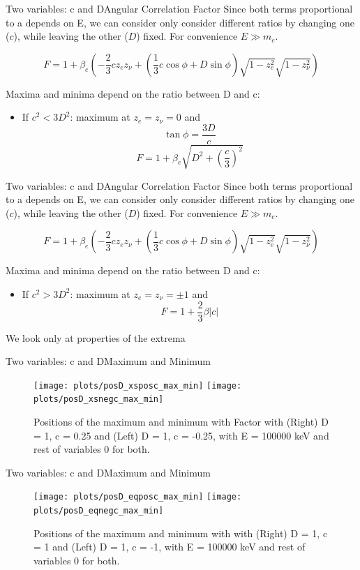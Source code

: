 \documentclass{beamer}
\begin{document}
\begin{frame}{Two variables: c and D}{Angular Correlation Factor}
	Since both terms proportional to a depends on E, we can consider only consider different ratios by changing one ($c$), while leaving the other ($D$) fixed. For convenience $E \gg m_e$.
	
	$$F = 1 + \beta_e\left(-\frac 23 c z_ez_\nu + \left(\frac 13 c\cos\phi + D \sin  \phi\right) \sqrt{1-z^2_e}\sqrt{1-z^2_\nu}\right)$$
	
	Maxima and minima depend on the ratio between D and c:
	\begin{itemize}
		\item If $c^2 < 3D^2$: maximum at $z_e = z_\nu = 0$ and	
		$$\tan\phi = \frac {3D}c$$
		$$F = 1 + \beta_e\sqrt{D^2+\left(\frac c3\right)^2}$$ 
	\end{itemize}
\end{frame}
\begin{frame}{Two variables: c and D}{Angular Correlation Factor}
	Since both terms proportional to a depends on E, we can consider only consider different ratios by changing one ($c$), while leaving the other ($D$) fixed. For convenience $E \gg m_e$.
	
	$$F = 1 + \beta_e\left(-\frac 23 c z_ez_\nu + \left(\frac 13 c\cos\phi + D \sin  \phi\right) \sqrt{1-z^2_e}\sqrt{1-z^2_\nu}\right)$$
	
	Maxima and minima depend on the ratio between D and c:
	\begin{itemize}
		\item If $c^2 > 3D^2$: maximum at $z_e = z_\nu =\pm 1$ and	
		$$F = 1 + \frac{2}{3}\beta|c|$$ 
	\end{itemize}
	We look only at properties of the extrema
\end{frame}
\begin{frame}{Two variables: c and D}{Maximum and Minimum}
	\begin{figure}
		\centering
		\texttt{[image: plots/posD\_xsposc\_max\_min]}
		\texttt{[image: plots/posD\_xsnegc\_max\_min]}
		\caption{Positions of the maximum and minimum with Factor with (Right) D = 1, c = 0.25 and (Left) D = 1, c = -0.25, with E = 100000 keV and rest of variables 0 for both.}
	\end{figure}
\end{frame}
\begin{frame}{Two variables: c and D}{Maximum and Minimum}
	\begin{figure}
		\centering
		\texttt{[image: plots/posD\_eqposc\_max\_min]}
		\texttt{[image: plots/posD\_eqnegc\_max\_min]}
		\caption{Positions of the maximum and minimum with with (Right) D = 1, c = 1 and (Left) D = 1, c = -1, with E = 100000 keV and rest of variables 0 for both.}
	\end{figure}
\end{frame}
\end{document}

